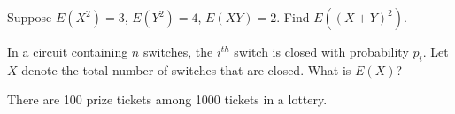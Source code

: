 \documentclass[addpoints,12pt]{exam}
\begin{document}
\begin{questions}
\newpage

\question[1] Suppose $E(X^2)=3$, $E(Y^2)=4$, $E(XY)=2$. Find $E((X+Y)^2)$.

\vspace{1in}

\question[2] In a circuit containing $n$ switches, the $i^{th}$ switch is closed with probability $p_i$. Let $X$ denote the total number of switches that are closed. What is $E(X)$?

\vspace{1in}

\question[5] There are 100 prize tickets among 1000 tickets in a lottery. 
\noaddpoints
{}
\addpoints

\end{questions}
\end{document}
